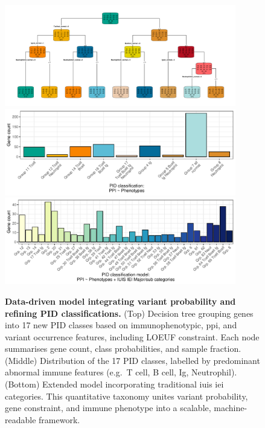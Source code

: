 \begin{figure}[ht]
  \centering
  \includegraphics[width=0.9\textwidth]{../images/p_new_classification_finetune_tree.pdf}       
  \includegraphics[width=0.9\textwidth]{../images/plot_new_pid_classifications_genetic.pdf}
  \includegraphics[width=0.9\textwidth]{../images/plot_multicat_new_pid_classes_combined.pdf}
\caption{\textbf{Data-driven model integrating variant probability and refining PID classifications.}
(Top) Decision tree grouping genes into 17 new PID classes based on immunophenotypic, \ac{ppi}, and variant occurrence features, including LOEUF constraint. Each node summarises gene count, class probabilities, and sample fraction.
(Middle) Distribution of the 17 PID classes, labelled by predominant abnormal immune features (e.g.\ T cell, B cell, Ig, Neutrophil).
(Bottom) Extended model incorporating traditional \ac{iuis} \ac{iei} categories. This quantitative taxonomy unites variant probability, gene constraint, and immune phenotype into a scalable, machine-readable framework.}
  \label{fig:pid_class_tree_distribution}
\end{figure}

